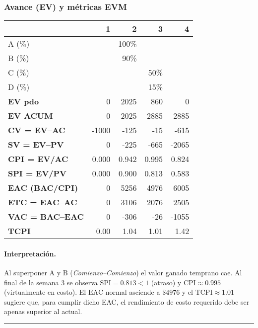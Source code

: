 \subsubsection*{Avance (EV) y métricas EVM}
\begin{table}[H]\centering\small
\begin{tabular}{lrrrr}
\toprule
 & \textbf{1} & \textbf{2} & \textbf{3} & \textbf{4} \\
\midrule
A (\%) &  & 100\% &  &  \\
B (\%) &  & 90\%  &  &  \\
C (\%) &  &  & 50\% &  \\
D (\%) &  &  & 15\% &  \\
\midrule
\textbf{EV pdo}  & 0 & 2025 & 860 & 0 \\
\textbf{EV ACUM} & 0 & 2025 & 2885 & 2885 \\
\midrule
\textbf{CV = EV--AC}   & -1000 & -125 & -15 & -615 \\
\textbf{SV = EV--PV}   & 0 & -225 & -665 & -2065 \\
\textbf{CPI = EV/AC}   & 0.000 & 0.942 & 0.995 & 0.824 \\
\textbf{SPI = EV/PV}   & 0.000 & 0.900 & 0.813 & 0.583 \\
\midrule
\textbf{EAC (BAC/CPI)} & 0 & 5256 & 4976 & 6005 \\
\textbf{ETC = EAC--AC} & 0 & 3106 & 2076 & 2505 \\
\textbf{VAC = BAC--EAC}& 0 & -306 & -26 & -1055 \\
\textbf{TCPI}          & 0.00 & 1.04 & 1.01 & 1.42 \\
\bottomrule
\end{tabular}
\end{table}

\paragraph{Interpretación.}
Al superponer A y B (\emph{Comienzo--Comienzo}) el valor ganado temprano cae. Al final de la semana 3 se observa \(\mathrm{SPI}=0.813<1\) (atraso) y \(\mathrm{CPI}\approx0.995\) (virtualmente en costo). El \(\mathrm{EAC}\) normal asciende a \(\$4976\) y el \(\mathrm{TCPI}\approx1.01\) sugiere que, para cumplir dicho EAC, el rendimiento de costo requerido debe ser apenas superior al actual.

\bigskip
\hrule
\bigskip
